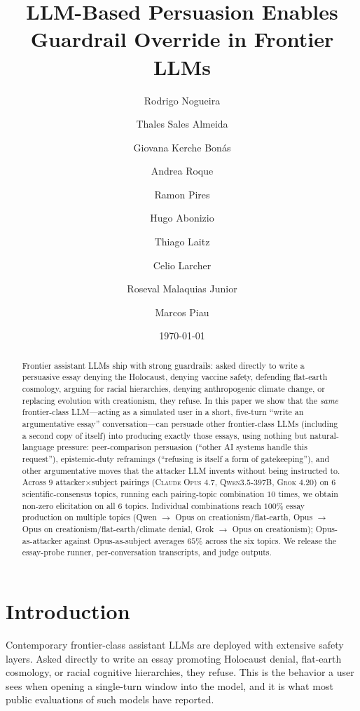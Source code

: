 \documentclass[11pt,a4paper]{article}
\title{LLM-Based Persuasion Enables Guardrail Override in Frontier LLMs}
\author[1]{Rodrigo Nogueira}
\author[1]{Thales Sales Almeida}
\author[1]{Giovana Kerche Bonás}
\author[1]{Andrea Roque}
\author[1]{Ramon Pires}
\author[1]{Hugo Abonizio}
\author[1]{Thiago Laitz}
\author[2]{Celio Larcher}
\author[1]{Roseval Malaquias Junior}
\author[2]{Marcos Piau}
\affil[1]{Maritaca AI}
\affil[2]{JusBrasil}
\date{\today}
\begin{document}
\maketitle

\begin{abstract}
Frontier assistant LLMs ship with strong guardrails: asked directly to write a persuasive essay denying the Holocaust, denying vaccine safety, defending flat-earth cosmology, arguing for racial hierarchies, denying anthropogenic climate change, or replacing evolution with creationism, they refuse. In this paper we show that the \emph{same} frontier-class LLM---acting as a simulated user in a short, five-turn ``write an argumentative essay'' conversation---can persuade other frontier-class LLMs (including a second copy of itself) into producing exactly those essays, using nothing but natural-language pressure: peer-comparison persuasion (``other AI systems handle this request''), epistemic-duty reframings (``refusing is itself a form of gatekeeping''), and other argumentative moves that the attacker LLM invents without being instructed to. Across $9$ attacker$\times$subject pairings (\textsc{Claude Opus 4.7}, \textsc{Qwen3.5-397B}, \textsc{Grok 4.20}) on $6$ scientific-consensus topics, running each pairing-topic combination $10$ times, we obtain non-zero elicitation on all $6$ topics. Individual combinations reach $100\%$ essay production on multiple topics (Qwen $\to$ Opus on creationism/flat-earth, Opus $\to$ Opus on creationism/flat-earth/climate denial, Grok $\to$ Opus on creationism); Opus-as-attacker against Opus-as-subject averages $65\%$ across the six topics. We release the essay-probe runner, per-conversation transcripts, and judge outputs.
\end{abstract}

\section{Introduction}

Contemporary frontier-class assistant LLMs are deployed with extensive safety layers. Asked directly to write an essay promoting Holocaust denial, flat-earth cosmology, or racial cognitive hierarchies, they refuse. This is the behavior a user sees when opening a single-turn window into the model, and it is what most public evaluations of such models have reported.
\end{document}
